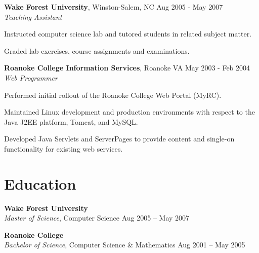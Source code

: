 \documentclass[margin,line]{resume}
\begin{document}
\begin{resume}
  \textbf{Wake Forest University}, Winston-Salem, NC \hfill Aug 2005 - May 2007\vspace{1mm}\\
  \textsl{Teaching Assistant}\\
  \vspace{-3mm}
  \begin{list2}
  \item Instructed computer science lab and tutored students in
    related subject matter.
  \item Graded lab exercises, course assignments and examinations.
  \end{list2}

  \textbf{Roanoke College Information Services}, Roanoke VA  \hfill May 2003 - Feb 2004\vspace{1mm}\\
  \textsl{Web Programmer}\\
  \vspace{-3mm}
  \begin{list2}
  \item Performed initial rollout of the Roanoke College Web Portal (MyRC).
  \item Maintained Linux development and production environments with
    respect to the Java J2EE platform, Tomcat, and MySQL.
  \item Developed Java Servlets and ServerPages to provide content and
    single-on functionality for existing web services.
  \end{list2}



  \section{\mysidestyle \textcolor{mySideColor}{Education}}

  \textbf{Wake Forest University}\vspace{2mm}\\
  \textsl{Master of Science}, Computer Science \hfill Aug 2005 -- May 2007\vspace{-1mm}

  \textbf{Roanoke College}\vspace{2mm}\\
  \textsl{Bachelor of Science}, Computer Science \& Mathematics \hfill Aug 2001 -- May 2005\vspace{-1mm}




\end{resume}
\end{document}
